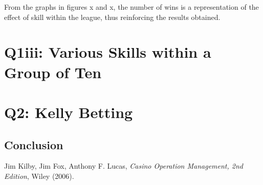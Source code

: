 \documentclass[12pt]{article}
\begin{document}

From the graphs in figures x and x, the number of wins is a representation of the effect of skill within the league, thus reinforcing the results obtained.
\section{Q1iii: Various Skills within a Group of Ten}
\section{Q2: Kelly Betting}

\subsection{Conclusion}
\begin{thebibliography}{3}
  Jim Kilby, Jim Fox, Anthony F. Lucas,
  \emph{Casino Operation Management, 2nd Edition},
  Wiley (2006).
\end{thebibliography}
\end{document}
